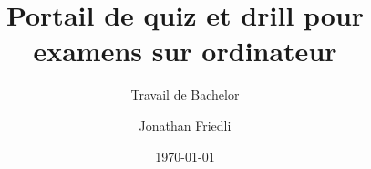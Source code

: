 \author{Jonathan Friedli}


\title{Portail de quiz et drill pour examens sur ordinateur}

\subtitle{Travail de Bachelor}


\date{\today}


